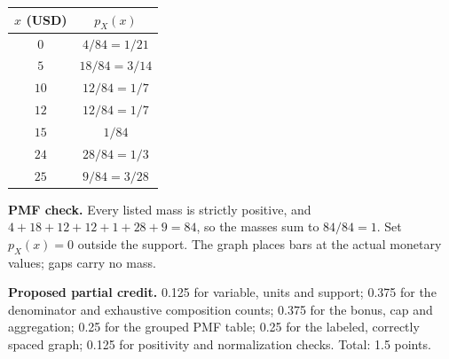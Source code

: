 \begin{center}
\begin{tabular}{cc}\toprule
$x$ (USD) & $p_X(x)$\\\midrule
$0$ & $4/84=1/21$\\
$5$ & $18/84=3/14$\\
$10$ & $12/84=1/7$\\
$12$ & $12/84=1/7$\\
$15$ & $1/84$\\
$24$ & $28/84=1/3$\\
$25$ & $9/84=3/28$\\
\bottomrule\end{tabular}
\end{center}


\begin{center}\end{center}

\textbf{PMF check.} Every listed mass is strictly positive, and $4+18+12+12+1+28+9=84$, so the masses sum to $84/84=1$. Set $p_X(x)=0$ outside the support. The graph places bars at the actual monetary values; gaps carry no mass.

\textbf{Proposed partial credit.} 0.125 for variable, units and support; 0.375 for the denominator and exhaustive composition counts; 0.375 for the bonus, cap and aggregation; 0.25 for the grouped PMF table; 0.25 for the labeled, correctly spaced graph; 0.125 for positivity and normalization checks. Total: 1.5 points.

